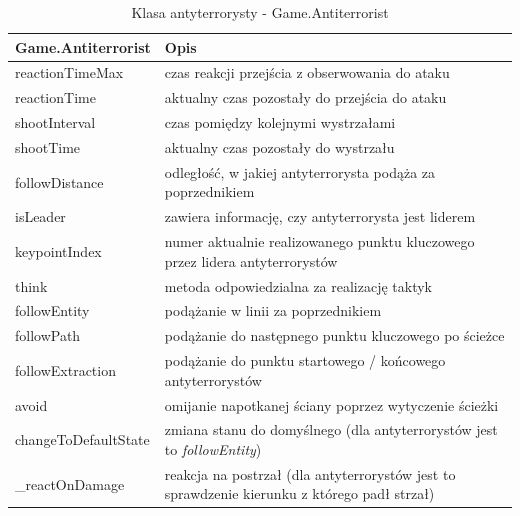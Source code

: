 \begin{table}
\begin{center}
\begin{tabular}{|p{}|p{}|}
\hline
\textbf{Game.Antiterrorist} & Opis\\\hline		
	reactionTimeMax & czas reakcji przejścia  z obserwowania do ataku\\
	reactionTime & aktualny czas pozostały do przejścia do ataku\\
	shootInterval & czas pomiędzy kolejnymi wystrzałami\\
	shootTime & aktualny czas pozostały do wystrzału\\
	followDistance & odległość, w jakiej antyterrorysta podąża za poprzednikiem\\
	isLeader & zawiera informację, czy antyterrorysta jest liderem\\
	keypointIndex & numer aktualnie realizowanego punktu kluczowego przez lidera antyterrorystów
\\\hline
	think & metoda odpowiedzialna za realizację taktyk\\
	followEntity & podążanie w linii za poprzednikiem\\ 
	followPath & podążanie do następnego punktu kluczowego po ścieżce\\
	followExtraction & podążanie do punktu startowego / końcowego antyterrorystów\\
	avoid & omijanie napotkanej ściany poprzez wytyczenie ścieżki\\
	changeToDefaultState & zmiana stanu do domyślnego (dla antyterrorystów jest to \emph{followEntity})\\
	\_reactOnDamage & reakcja na postrzał (dla antyterrorystów jest to sprawdzenie kierunku z którego padł strzał)
\\\hline
\end{tabular}
\caption {Klasa antyterrorysty - Game.Antiterrorist\label{objectsGameAntiterrorist}}
\end{center}
\end{table} 


